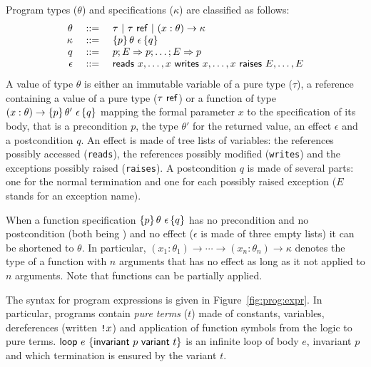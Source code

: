 \documentclass[a4paper,12pt]{report}
\begin{document}
Program types ($\theta$) and specifications ($\kappa$) 
are classified as follows:
\begin{displaymath}
  \begin{array}{rrl}
    \theta & ~::=~ & \tau ~|~ \tau~\mathsf{ref} ~|~ (x:\theta) \rightarrow\kappa \\
    \kappa &~::=~& \{p\}\,\theta~\epsilon\,\{q\} \\
    q &~::=~& p;E\Rightarrow p;\dots;E\Rightarrow p \\
    \epsilon &~::=~&
    \mathsf{reads}~x,\dots,x~\mathsf{writes}~x,\dots,x ~ \mathsf{raises}~E,\dots,E 
  \end{array}
\end{displaymath}
A value of type $\theta$ is either an immutable variable of a
pure type ($\tau$), a reference containing a value of a pure type
($\tau~\mathsf{ref}$) or a function of type
$(x:\theta)\rightarrow\{p\}\,\theta'~\epsilon\,\{q\}$ 
mapping the formal parameter $x$ to the specification of its body, that
is a precondition $p$, the type $\theta'$ for the returned value,
an effect $\epsilon$ and a postcondition $q$. An effect
is made of tree lists of variables: the references possibly accessed
(\texttt{reads}), the references possibly modified (\texttt{writes})
and the exceptions possibly raised (\texttt{raises}). A postcondition
$q$ is made of several parts: one 
for the normal termination and one for each possibly raised exception
($E$ stands for an exception name).

When a function specification $\{p\}\,\theta~\epsilon\,\{q\}$ has no
precondition and no postcondition (both being \ptrue) and no effect
($\epsilon$ is made of three empty lists) it can be shortened to
$\theta$. In particular,
$(x_1:\theta_1)\rightarrow\cdots\rightarrow(x_n:\theta_n)\rightarrow\kappa$
denotes the type of a function with $n$ arguments that has no effect
as long as it not applied to $n$ arguments. Note that functions can be
partially applied.

The syntax for program expressions is given in Figure~\ref{fig:prog:expr}.
In particular, programs contain \emph{pure terms} ($t$) made of
constants, variables, dereferences (written $\texttt{!}x$) and application
of function symbols from the logic to pure terms. 
$\mathsf{loop}~e~\{\mathsf{invariant}~p~\mathsf{variant}~t\}$ is an infinite loop of body $e$, invariant $p$ and
which termination is ensured by the variant $t$. 
\end{document}

